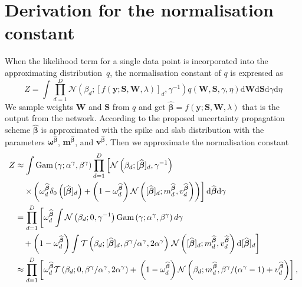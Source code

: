 \documentclass{article}
\begin{document}
\section{Derivation for the normalisation constant}
When the likelihood term for a single data point is incorporated into the approximating distribution~$q$, the normalisation constant of $q$ is expressed as
\begin{equation}
\label{eq:Z}
Z = \int \prod_{d=1}^{D} \mathcal{N}(\beta_d ; [f(\mathbf{y} ; \mathbf{S}, \mathbf{W}, \lambda)]_d, \gamma^{-1}) q(\mathbf{W}, \mathbf{S}, \gamma, \eta) \mathrm{d}\mathbf{W} \mathrm{d}\mathbf{S} \mathrm{d}\gamma \mathrm{d}\eta
\end{equation}
We sample weights $\mathbf{W}$ and $\mathbf{S}$ from $q$ and get $\widehat{\boldsymbol\beta} = f(\mathbf{y} ; \mathbf{S}, \mathbf{W}, \lambda)$ that is the output from the network. According to the proposed uncertainty propagation scheme $\widehat{\boldsymbol\beta}$ is approximated with the spike and slab distribution with the parameters $\boldsymbol\omega^{\widehat{\boldsymbol\beta}}$, $\mathbf{m}^{\widehat{\boldsymbol\beta}}$, and $\mathbf{v}^{\widehat{\boldsymbol\beta}}$. Then we approximate the normalisation constant
\begin{align}
Z &\approx \int \text{Gam} \left(\gamma; \alpha^\gamma, \beta^\gamma\right) \prod_{d=1}^{D} \left[ \mathcal{N}\left(\beta_d ; [\widehat{\boldsymbol\beta}]_d, \gamma^{-1}\right) \right.\\
&\quad \left. \times  \left(\omega^{\widehat{\boldsymbol\beta}}_d \delta_0\left([\widehat{\boldsymbol\beta}]_d\right) + \left(1 - \omega^{\widehat{\boldsymbol\beta}}_d\right)\mathcal{N}\left([\widehat{\boldsymbol\beta}]_d ; m^{\widehat{\boldsymbol\beta}}_d, v^{\widehat{\boldsymbol\beta}}_d\right)\right) \right] \mathrm{d}\widehat{\boldsymbol\beta} \mathrm{d}\gamma  \nonumber\\
& = \prod_{d=1}^{D} \left[\omega^{\widehat{\boldsymbol\beta}}_d \int \mathcal{N}\left(\beta_d ; 0, \gamma^{-1}\right)  \text{Gam} \left(\gamma; \alpha^\gamma, \beta^\gamma\right) d\gamma  \nonumber \right.\\
&\quad + \left(1 - \omega^{\widehat{\boldsymbol\beta}}_d\right)\int \mathcal{T}\left(\beta_d ; [\widehat{\boldsymbol\beta}]_d, \beta^\gamma / \alpha^\gamma, 2\alpha^\gamma\right) 
\left. \vphantom{\int}  \mathcal{N}\left([\widehat{\boldsymbol\beta}]_d ; m^{\widehat{\boldsymbol\beta}}_d, v^{\widehat{\boldsymbol\beta}}_d\right) \mathrm{d}[\widehat{\boldsymbol\beta}]_d\right]  \nonumber\\
\label{eq:Z_approx}
& \approx \prod_{d=1}^D \left[\omega^{\widehat{\boldsymbol\beta}}_d  \mathcal{T}\left(\beta_d ; 0, \beta^\gamma / \alpha^\gamma, 2\alpha^\gamma\right) + \vphantom{m^{\widehat{\boldsymbol\beta}}_d} \left(1 - \omega^{\widehat{\boldsymbol\beta}}_d\right)\mathcal{N}\left(\beta_d ; m^{\widehat{\boldsymbol\beta}}_d,  \beta^\gamma / (\alpha^\gamma - 1) + v^{\widehat{\boldsymbol\beta}}_d\right)\right],
\end{align}
\end{document}
